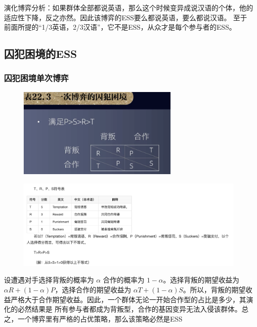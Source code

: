 \documentclass[12pt, a4paper]{article} %
\begin{document}
\begin{CJK*}{UTF8}{gbsn}
        演化博弈分析：如果群体全部都说英语，那么这个时候变异成说汉语的个体，他的适应性下降，反之亦然。因此该博弈的ESS要么都说英语，要么都说汉语。
        至于前面所提的“1/3英语，2/3汉语”，它不是ESS，从众才是每个参与者的ESS。

        \subsection{囚犯困境的ESS}
        \subsubsection{囚犯困境单次博弈}
        \begin{figure}[htbp]
            \includegraphics[width=0.7\textwidth]{./figures/catch2023-08-05-17.34.34.png}
        \end{figure}

        \begin{figure}[htbp]
            \includegraphics[width=1\textwidth]{./figures/catch2023-08-05-17.47.51.png}
        \end{figure}

        设遭遇对手选择背叛的概率为 $\alpha$ 合作的概率为 $1-\alpha$。选择背叛的期望收益为 $\alpha R+(1-\alpha)P$，选择合作的期望收益为
         $\alpha T+(1-\alpha)S$。所以，背叛的期望收益严格大于合作期望收益。因此，一个群体无论一开始合作型的占比是多少，其演化的必然结果是
         所有参与者都成为背叛型，合作的基因变异无法入侵该群体。总之，一个博弈里有严格的占优策略，那么该策略必然是ESS \par


\end{CJK*}
\end{document}
